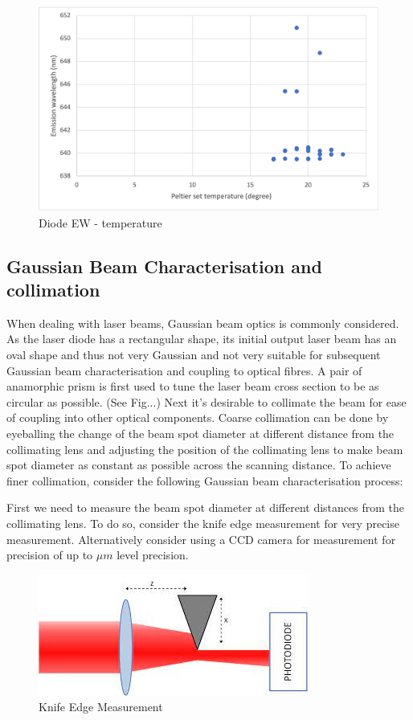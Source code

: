 \documentclass[12pt,A4Paper]{article}
\begin{document}
\begin{figure}[H]
    \centering
    \includegraphics{diodeLaserEW.png}
    \caption{Diode EW - temperature}
    \label{fig:diodeLaserEW}
\end{figure}
\subsection{Gaussian Beam Characterisation and collimation}
When dealing with laser beams, Gaussian beam optics is commonly considered. As the laser diode has a rectangular shape, its initial output laser beam has an oval shape and thus not very Gaussian and not very suitable for subsequent Gaussian beam characterisation and coupling to optical fibres. A pair of anamorphic prism is first used to tune the laser beam cross section to be as circular as possible. (See Fig...) Next it's desirable to collimate the beam for ease of coupling into other optical components. Coarse collimation can be done by eyeballing the change of the beam spot diameter at different distance from the collimating lens and adjusting the position of the collimating lens to make beam spot diameter as constant as possible across the scanning distance. To achieve finer collimation, consider the following Gaussian beam characterisation process: 
\par
First we need to measure the beam spot diameter at different distances from the collimating lens. To do so, consider the knife edge measurement for very precise measurement. Alternatively consider using a CCD camera for measurement for precision of up to $\mu m$ level precision. 
\par

\begin{figure}[H]
    \centering
    \includegraphics[width=.6\textwidth]{knifeEdgeMeasurement.jpeg}
    \caption{Knife Edge Measurement}
    \label{fig:my_label}
\end{figure}
\end{document}
